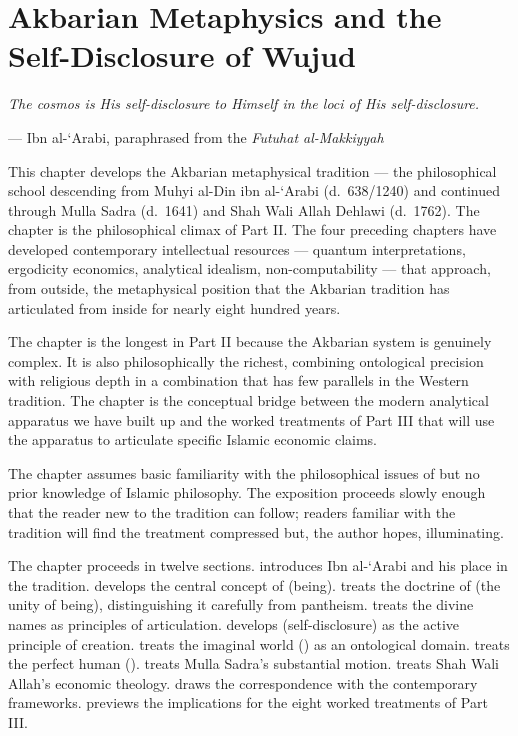 \chapter{Akbarian Metaphysics and the Self-Disclosure of Wujud}
\label{ch:akbarian}

\epigraph{\itshape The cosmos is His self-disclosure to Himself in
the loci of His self-disclosure.}{--- Ibn al-`Arabi, paraphrased
from the \emph{Futuhat al-Makkiyyah}}

\noindent
This chapter develops the Akbarian metaphysical tradition --- the
philosophical school descending from Muhyi al-Din ibn al-`Arabi
(d.~638/1240) and continued through Mulla Sadra (d.~1641) and Shah
Wali Allah Dehlawi (d.~1762). The chapter is the philosophical
climax of Part II. The four preceding chapters have developed
contemporary intellectual resources --- quantum interpretations,
ergodicity economics, analytical idealism, non-computability ---
that approach, from outside, the metaphysical position that the
Akbarian tradition has articulated from inside for nearly eight
hundred years.

The chapter is the longest in Part II because the Akbarian system
is genuinely complex. It is also philosophically the richest,
combining ontological precision with religious depth in a
combination that has few parallels in the Western tradition. The
chapter is the conceptual bridge between the modern analytical
apparatus we have built up and the worked treatments of Part III
that will use the apparatus to articulate specific Islamic economic
claims.

The chapter assumes basic familiarity with the philosophical issues
of  but no prior knowledge of Islamic
philosophy. The exposition proceeds slowly enough that the reader
new to the tradition can follow; readers familiar with the tradition
will find the treatment compressed but, the author hopes,
illuminating.

The chapter proceeds in twelve sections.
 introduces Ibn al-`Arabi and his place in
the tradition.
 develops the central concept of
 (being).
 treats the doctrine of
 (the unity of being), distinguishing it
carefully from pantheism.
 treats the divine names as principles of
articulation.
 develops  (self-disclosure)
as the active principle of creation.
 treats the imaginal world () as an ontological domain.
 treats the perfect human ().
 treats Mulla Sadra's substantial motion.
 treats Shah Wali Allah's economic
theology.
 draws the correspondence with
the contemporary frameworks.
 previews the implications for the
eight worked treatments of Part III.

